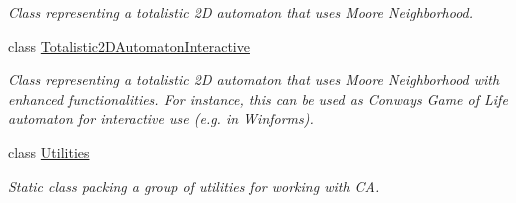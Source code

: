 \begin{DoxyCompactItemize}
\begin{DoxyCompactList}\small\item\em Class representing a totalistic 2\+D automaton that uses Moore Neighborhood. \end{DoxyCompactList}\item 
class \hyperlink{class_cellular_1_1_totalistic2_d_automaton_interactive}{Totalistic2\+D\+Automaton\+Interactive}
\begin{DoxyCompactList}\small\item\em Class representing a totalistic 2\+D automaton that uses Moore Neighborhood with enhanced functionalities. For instance, this can be used as Conway\textquotesingle{}s Game of Life automaton for interactive use (e.\+g. in Winforms). \end{DoxyCompactList}\item 
class \hyperlink{class_cellular_1_1_utilities}{Utilities}
\begin{DoxyCompactList}\small\item\em Static class packing a group of utilities for working with C\+A. \end{DoxyCompactList}\end{DoxyCompactItemize}
